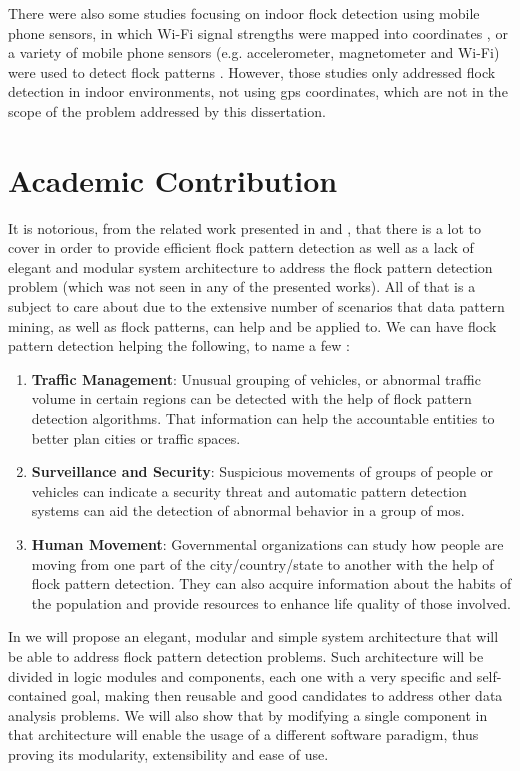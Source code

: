 There were also some studies focusing on indoor flock detection using mobile phone sensors, in which Wi-Fi signal
strengths were mapped into coordinates \citep{mobile1}, or a variety of mobile phone sensors (e.g. accelerometer,
magnetometer and Wi-Fi) were used to detect flock patterns \citep{mobile2}. However, those studies only addressed flock
detection in indoor environments, not using \ac{gps} coordinates, which are not in the scope of the problem addressed by
this dissertation.

\section{Academic Contribution}
It is notorious, from the related work presented in  and , that there is
a lot to cover in order to provide efficient flock pattern detection as well as a lack of elegant and modular system
architecture to address the flock pattern detection problem (which was not seen in any of the presented works). All of
that is a subject to care about due to the extensive number of scenarios that data pattern mining, as well as flock
patterns, can help and be applied to. We can have flock pattern detection helping the following, to name a few
\citep{applications}:

\begin{enumerate}
    \item \textbf{Traffic Management}: Unusual grouping of vehicles, or abnormal traffic volume in certain regions can
        be detected with the help of flock pattern detection algorithms. That information can help the accountable
        entities to better plan cities or traffic spaces.
    \item \textbf{Surveillance and Security}: Suspicious movements of groups of people or vehicles can indicate a
        security threat and automatic pattern detection systems can aid the detection of abnormal behavior in a group of
        \acp{mo}.
    \item \textbf{Human Movement}: Governmental organizations can study how people are moving from one part of the
        city/country/state to another with the help of flock pattern detection. They can also acquire information about
        the habits of the population and provide resources to enhance life quality of those involved.
\end{enumerate}

In  we will propose an elegant, modular and simple system architecture that will be able to
address flock pattern detection problems. Such architecture will be divided in logic modules and components, each one
with a very specific and self-contained goal, making then reusable and good candidates to address other data analysis
problems. We will also show that by modifying a single component in that architecture will enable the usage of a
different software paradigm, thus proving its modularity, extensibility and ease of use.

